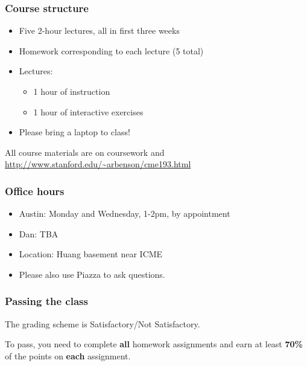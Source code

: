 \documentclass{beamer}
\begin{document}
\begin{frame}
\frametitle{Course structure}

\begin{itemize}
\setlength{\itemsep}{0.2in}
\item{
Five 2-hour lectures, all in first three weeks
}

\item{
Homework corresponding to each lecture (5 total)
}

\item{
Lectures:
\begin{itemize}
\setlength{\itemsep}{0.05in}
\item{1 hour of instruction}
\item{1 hour of interactive exercises}
\end{itemize}
}

\item{
Please bring a laptop to class!
}
\end{itemize}

\vspace{0.2in}

All course materials are on coursework and \url{http://www.stanford.edu/~arbenson/cme193.html}

\end{frame}

\begin{frame}
\frametitle{Office hours}

\begin{itemize}
\setlength{\itemsep}{0.2in}
\item{Austin: Monday and Wednesday, 1-2pm, by appointment}
\item{Dan: TBA}
\item{Location: Huang basement near ICME}
\item{Please also use Piazza to ask questions.}
\end{itemize}

\end{frame}


\begin{frame}
\frametitle{Passing the class}

The grading scheme is Satisfactory/Not Satisfactory.

\vspace{0.2in}

To pass, you need to complete \textbf{all} homework assignments and earn at least \textbf{70\%} of the points on \textbf{each} assignment.

\end{frame}
\end{document}
